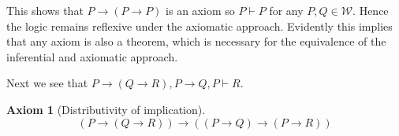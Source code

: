 \documentclass{amsbook}
\newcommand{\infers}{\mathrel\vdash}
\newcommand{\then}{\mathrel\rightarrow}
\theoremstyle{definition}
\newtheorem{axm}{Axiom}[section]
\begin{document}
This shows that $P \then (P \then P)$ is an axiom so $P \infers P$ for any $P, Q \in \mathcal W$. Hence the logic remains reflexive under the axiomatic approach. Evidently this implies that any axiom is also a theorem, which is necessary for the equivalence of the inferential and axiomatic approach.

Next we see that $P \then (Q \then R), P \then Q, P \infers R$.

\begin{axm}[Distributivity of implication]
    $$(P \then (Q \then R)) \then ((P \then Q) \then (P \then R))$$
\end{axm}
\end{document}
